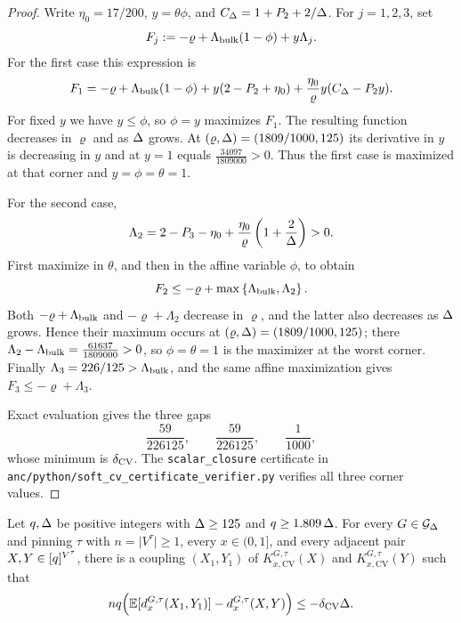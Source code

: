 \begin{proof}
Write $\eta_0=17/200$, $y=\theta\phi$, and
$C_\Delta=1+P_2+2/\Delta$.  For \(j=1,2,3\), set
\[
 F_j:=-\varrho+\Lambda_{\rm bulk}(1-\phi)+y\Lambda_j.
\]
For the first case this expression is
\[
 F_1=-\varrho+\Lambda_{\rm bulk}(1-\phi)
       +y(2-P_2+\eta_0)
       +\frac{\eta_0}{\varrho}y(C_\Delta-P_2y).
\]
For fixed $y$ we have $y\le\phi$, so $\phi=y$ maximizes $F_1$. The resulting
function decreases in $\varrho$ and as $\Delta$ grows. At
$(\varrho,\Delta)=(1809/1000,125)$ its derivative in $y$ is decreasing in
$y$ and at $y=1$ equals $\tfrac{34097}{1809000}>0$. Thus the first case
is maximized at that corner and $y=\phi=\theta=1$.

For the second case,
\[
 \Lambda_2=2-P_3-\eta_0+
    \frac{\eta_0}{\varrho}\left(1+\frac2{\Delta}\right)>0.
\]
First maximize in $\theta$, and then in the affine variable $\phi$, to obtain
\[
 F_2\le-\varrho+\max\left\{\Lambda_{\rm bulk},\Lambda_2\right\}.
\]
Both $-\varrho+\Lambda_{\rm bulk}$ and $-\varrho+\Lambda_2$ decrease in $\varrho$,
and the latter also decreases as $\Delta$ grows. Hence their maximum occurs
at $(\varrho,\Delta)=(1809/1000,125)$; there
$\Lambda_2-\Lambda_{\rm bulk}=\tfrac{61637}{1809000}>0$, so
$\phi=\theta=1$ is the
maximizer at the worst corner. Finally
$\Lambda_3=226/125>\Lambda_{\rm bulk}$, and the same affine maximization
gives $F_3\le-\varrho+\Lambda_3$.

Exact evaluation gives the three gaps
\[
 \frac{59}{226125},\qquad\frac{59}{226125},\qquad\frac1{1000},
\]
whose minimum is \(\delta_{\rm CV}\).  The \texttt{scalar\_closure} certificate in
\nolinkurl{anc/python/soft_cv_certificate_verifier.py} verifies all three
corner values.
\end{proof}

\begin{theorem}\label{thm:cv-contraction}
Let \(q,\Delta\) be positive integers with \(\Delta\ge125\) and
\(q\ge1.809\,\Delta\). For every \(G\in\mathcal{G}_{\Delta}\) and pinning \(\tau\) with
\(n=\lvert V^\tau\rvert\ge1\), every \(x\in(0,1]\), and every adjacent pair
\(X,Y\in[q]^{V^\tau}\),
there is a coupling \((X_1,Y_1)\) of
\(K_{x,\mathrm{CV}}^{G,\tau}(X)\) and \(K_{x,\mathrm{CV}}^{G,\tau}(Y)\) such that
\begin{equation}\label{eq:cv-contraction}
  nq\Bigl(\operatorname{\mathbb{E}}[d_x^{G,\tau}(X_1,Y_1)]-d_x^{G,\tau}(X,Y)\Bigr)
  \le-\delta_{\rm CV}\Delta.
\end{equation}
\end{theorem}

